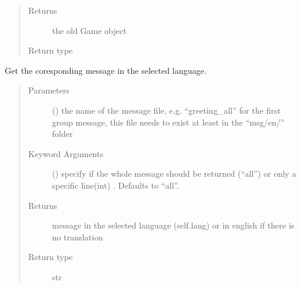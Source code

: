 \documentclass[letterpaper,10pt,english]{sphinxmanual}
\begin{document}
\begin{fulllineitems}
\begin{fulllineitems}
\begin{quote}
\begin{description}
\item[{Returns}] \leavevmode
the old Game object

\item[{Return type}] \leavevmode
{\hyperref[\detokenize{chatwolf:chatwolf.game.Game}]{}}

\end{description}\end{quote}

\end{fulllineitems}


\begin{fulllineitems}
\label{\detokenize{chatwolf:chatwolf.game.Game.msg}}
Get the coresponding message in the selected language.
\begin{quote}\begin{description}
\item[{Parameters}] \leavevmode
{} () \textendash{} the name of the message file,
e.g. “greeting\_all” for the first group message,
this file needs to exist at least in the “msg/en/” folder

\item[{Keyword Arguments}] \leavevmode
{} (\sphinxstyleliteralemphasis{\sphinxupquote{, }}) \textendash{} specify if the whole message should be returned (“all”)
or only a specific line(int) . Defaults to “all”.

\item[{Returns}] \leavevmode
message in the selected language (self.lang) or in english if there is no translation

\item[{Return type}] \leavevmode
str

\end{description}\end{quote}

\end{fulllineitems}


\end{fulllineitems}
\end{document}
